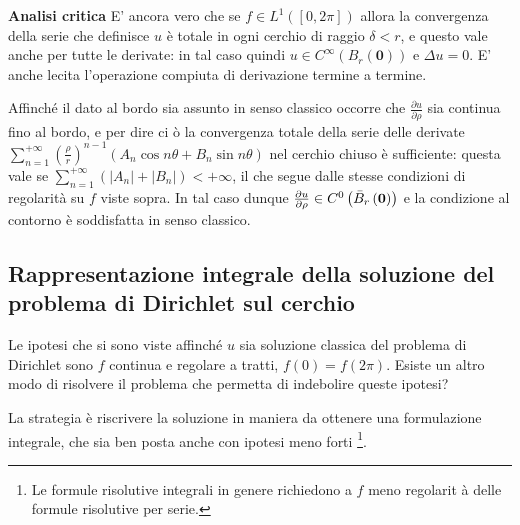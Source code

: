 \documentclass{article}
\begin{document}
\textbf{Analisi critica} E' ancora vero che se $f\in L^{1}\left( \left[
0,2\pi \right] \right) $ allora la convergenza della serie che definisce $u$ 
\`{e} totale in ogni cerchio di raggio $\delta <r$, e questo vale anche per
tutte le derivate: in tal caso quindi $u\in C^{\infty }\left( B_{r}\left( 
\mathbf{0}\right) \right) $ e $\Delta u=0$. E' anche lecita l'operazione
compiuta di derivazione termine a termine.

Affinch\'{e} il dato al bordo sia assunto in senso classico occorre che $%
\frac{\partial u}{\partial \rho }$ sia continua fino al bordo, e per dire ci%
\`{o} la convergenza totale della serie delle derivate $\sum_{n=1}^{+\infty
}\left( \frac{\rho }{r}\right) ^{n-1}\left( A_{n}\cos n\theta +B_{n}\sin
n\theta \right) $ nel cerchio chiuso \`{e} sufficiente: questa vale se $%
\sum_{n=1}^{+\infty }\left( \left\vert A_{n}\right\vert +\left\vert
B_{n}\right\vert \right) <+\infty $, il che segue dalle stesse condizioni di
regolarit\`{a} su $f$ viste sopra. In tal caso dunque $\frac{\partial u}{%
\partial \rho }\in C^{0}\left( \bar{B}_{r}\left( \mathbf{0}\right) \right) $
e la condizione al contorno \`{e} soddisfatta in senso classico.

\subsection{Rappresentazione integrale della soluzione del problema di
Dirichlet sul cerchio}

Le ipotesi che si sono viste affinch\'{e} $u$ sia soluzione classica del
problema di Dirichlet sono $f$ continua e regolare a tratti, $f\left(
0\right) =f\left( 2\pi \right) $. Esiste un altro modo di risolvere il
problema che permetta di indebolire queste ipotesi?

La strategia \`{e} riscrivere la soluzione in maniera da ottenere una
formulazione integrale, che sia ben posta anche con ipotesi meno forti%
\footnote{%
Le formule risolutive integrali in genere richiedono a $f$ meno regolarit%
\`{a} delle formule risolutive per serie.}.
\end{document}
